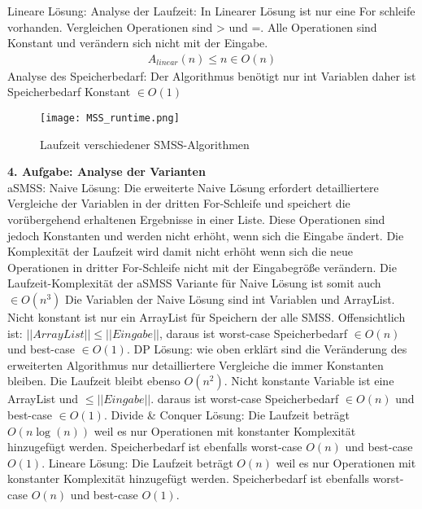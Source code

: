 \documentclass{article}
\begin{document}
\begin{flushleft}
\newline
Lineare Lösung:
\newline
Analyse der Laufzeit: In Linearer Lösung ist nur eine For schleife vorhanden. Vergleichen Operationen sind > und =. Alle Operationen sind Konstant 
und verändern sich nicht mit der Eingabe. 
\begin{align*}
    A_{linear}(n) \leq n \in O(n)
\end{align*}
\newline
Analyse des Speicherbedarf: Der Algorithmus benötigt nur int Variablen daher ist Speicherbedarf Konstant $\in O(1)$
\begin{figure}[ht]
\centering
\texttt{[image: MSS\_runtime.png]}
\caption{Laufzeit verschiedener SMSS-Algorithmen}
\end{figure}
\newline
\textbf{4. Aufgabe: Analyse der Varianten}\\
aSMSS:
\newline
Naive Lösung: Die erweiterte Naive Lösung erfordert detailliertere Vergleiche der Variablen in der 
dritten For-Schleife und speichert die vorübergehend erhaltenen Ergebnisse in einer Liste. 
Diese Operationen sind jedoch Konstanten und werden nicht erhöht, wenn sich die Eingabe ändert.
Die Komplexität der Laufzeit wird damit nicht erhöht wenn sich die neue Operationen in dritter For-Schleife 
nicht mit der Eingabegröße verändern. Die Laufzeit-Komplexität der aSMSS Variante für Naive Lösung ist somit auch $\in O(n^3)$ 
Die Variablen der Naive Lösung sind int Variablen und ArrayList. Nicht konstant ist nur ein ArrayList für Speichern der alle SMSS.
Offensichtlich ist: $||ArrayList|| \leq ||Eingabe||$, daraus ist worst-case Speicherbedarf $\in O(n)$ und best-case $\in O(1)$. 
\newline
DP Lösung: wie oben erklärt sind die Veränderung des erweiterten Algorithmus nur detailliertere 
Vergleiche die immer Konstanten bleiben. Die Laufzeit bleibt ebenso $O(n^2)$.
Nicht konstante Variable ist eine ArrayList und $ \leq ||Eingabe||$. daraus ist worst-case Speicherbedarf $\in O(n)$ und best-case $\in O(1)$.
\newline
Divide \& Conquer Lösung:
Die Laufzeit beträgt $O(n\log(n))$ weil es nur Operationen mit konstanter Komplexität hinzugefügt werden.
Speicherbedarf ist ebenfalls worst-case $O(n)$ und best-case $O(1)$.
\newline
Lineare Lösung: Die Laufzeit beträgt $O(n)$ weil es nur Operationen mit konstanter Komplexität hinzugefügt werden.
Speicherbedarf ist ebenfalls worst-case $O(n)$ und best-case $O(1)$.

\end{flushleft}
\end{document}
